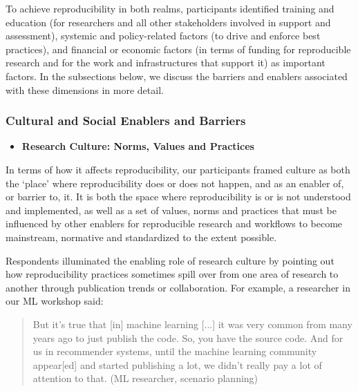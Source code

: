 \documentclass[authordate, meta]{jote-new-article}
\begin{document}
	To achieve reproducibility in both realms, participants identified training and education (for researchers and all other stakeholders involved in support and assessment), systemic and policy-related factors (to drive and enforce best practices), and financial or economic factors (in terms of funding for reproducible research and for the work and infrastructures that support it) as important factors. In the subsections below, we discuss the barriers and enablers associated with these dimensions in more detail.



	\subsubsection{Cultural and Social Enablers and Barriers}


\begin{itemize}[after=\vspace{-\baselineskip}]
	\item \textbf{Research Culture: Norms, Values and Practices}
\end{itemize}
	



	\noindent In terms of how it affects reproducibility, our participants framed culture as both the ‘place' where reproducibility does or does not happen, and as an enabler of, or barrier to, it. It is both the space where reproducibility is or is not understood and implemented, as well as a set of values, norms and practices that must be influenced by other enablers for reproducible research and workflows to become mainstream, normative and standardized to the extent possible.








	Respondents illuminated the enabling role of research culture by pointing out how reproducibility practices sometimes spill over from one area of research to another through publication trends or collaboration. For example, a researcher in our ML workshop said:



	\begin{quote}But it's true that [in] machine learning [...] it was very common from many years ago to just publish the code. So, you have the source code. And for us in recommender systems, until the machine learning community appear[ed] and started publishing a lot, we didn't really pay a lot of attention to that. (ML researcher, scenario planning)\end{quote}
\end{document}

